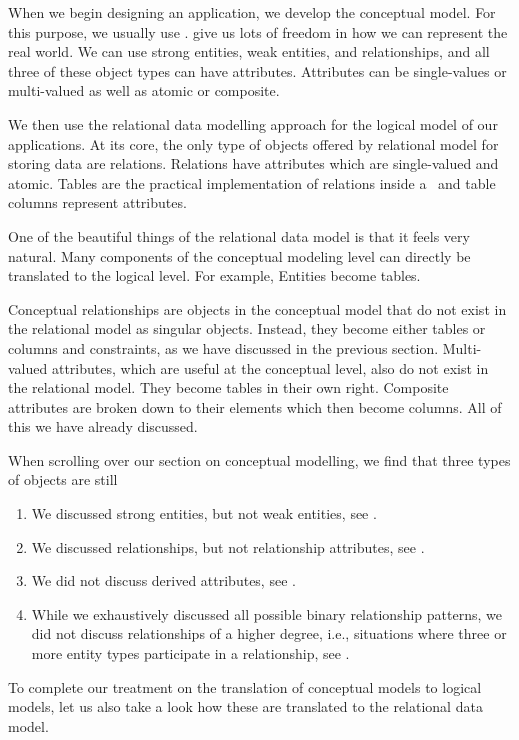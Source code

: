 %
%
When we begin designing an application, we develop the conceptual model.
For this purpose, we usually use .
 give us lots of freedom in how we can represent the real world.
We can use strong entities, weak entities, and relationships, and all three of these object types can have attributes.
Attributes can be single-values or multi-valued as well as atomic or composite.

We then use the relational data modelling approach for the logical model of our applications.
At its core, the only type of objects offered by relational model for storing data are relations.
Relations have attributes which are single-valued and atomic.
Tables are the practical implementation of relations inside a \dbms\ and table columns represent attributes.

One of the beautiful things of the relational data model is that it feels very natural.
Many components of the conceptual modeling level can directly be translated to the logical level.
For example, Entities become tables.

Conceptual relationships are objects in the conceptual model that do not exist in the relational model as singular objects.
Instead, they become either tables or columns and constraints, as we have discussed in the previous section.
Multi-valued attributes, which are useful at the conceptual level, also do not exist in the relational model.
They become tables in their own right.
Composite attributes are broken down to their elements which then become columns.
All of this we have already discussed.

When scrolling over our section on conceptual modelling, we find that three types of objects are still %
%
\begin{enumerate}%
%
\item We discussed strong entities, but not weak entities, see .%
%
\item We discussed relationships, but not relationship attributes, see .%
%
\item We did not discuss derived attributes, see .%
%
\item While we exhaustively discussed all possible binary relationship patterns, we did not discuss relationships of a higher degree, i.e., situations where three or more entity types participate in a relationship, see .%
%
\end{enumerate}%
%
To complete our treatment on the translation of conceptual models to logical models, let us also take a look how these are translated to the relational data model.%
%
\FloatBarrier%
%
%
%
%
%
%
\endhsection%
%
